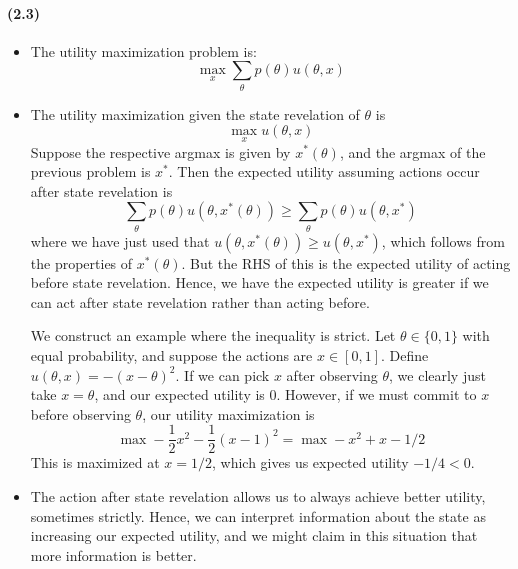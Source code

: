 \documentclass[10pt,letter]{article}
\begin{document}
\paragraph{(2.3)}
\begin{itemize}
\item The utility maximization problem is:
\[ \max_x \sum_\theta p(\theta) u(\theta, x) \]
\item The utility maximization given the state revelation of $\theta$ is
\[ \max_x u(\theta, x) \]
Suppose the respective argmax is given by $x^*(\theta)$, and the argmax of the previous problem is $x^*$. Then the expected utility assuming actions occur after state revelation is
\[ \sum_\theta p(\theta) u(\theta, x^*(\theta)) \ge \sum_\theta p(\theta) u(\theta, x^*) \]
where we have just used that $u(\theta, x^*(\theta)) \ge u(\theta, x^*)$, which follows from the properties of $x^*(\theta)$. But the RHS of this is the expected utility of acting before state revelation. Hence, we have the expected utility is greater if we can act after state revelation rather than acting before.

We construct an example where the inequality is strict. Let $\theta \in \{ 0, 1\}$ with equal probability, and suppose the actions are $x \in [0,1]$. Define $u(\theta, x) = -(x - \theta)^2$. If we can pick $x$ after observing $\theta$, we clearly just take $x = \theta$, and our expected utility is $0$. However, if we must commit to $x$ before observing $\theta$, our utility maximization is
\[ \max -\frac{1}{2}x^2 - \frac{1}{2}(x-1)^2 = \max - x^2 + x - 1/2 \]
This is maximized at $x = 1/2$, which gives us expected utility $-1/4 < 0$.
\item The action after state revelation allows us to always achieve better utility, sometimes strictly. Hence, we can interpret information about the state as increasing our expected utility, and we might claim in this situation that more information is better.
\end{itemize}
\end{document}
